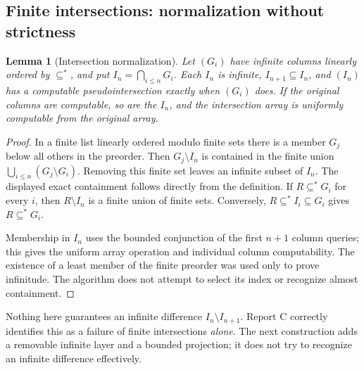 \documentclass[11pt,a4paper]{article}
\newcommand{\substar}{\subseteq^{*}}\newcommand{\lestar}{\leq^{*}}
\newtheorem{lemma}[theorem]{Lemma}
\theoremstyle{definition}\newtheorem{definition}[theorem]{Definition}
\theoremstyle{remark}\newtheorem{remark}[theorem]{Remark}
\begin{document}
\subsection{Finite intersections: normalization without strictness}
\begin{lemma}[Intersection normalization]\label{lem:intersection}\label{prop:intersection}
Let $(G_i)$ have infinite columns linearly ordered by $\substar$, and put $I_n=\bigcap_{i\leq n}G_i$. Each $I_n$ is infinite, $I_{n+1}\subseteq I_n$, and $(I_n)$ has a computable pseudointersection exactly when $(G_i)$ does. If the original columns are computable, so are the $I_n$, and the intersection array is uniformly computable from the original array.
\end{lemma}
\begin{proof}
In a finite list linearly ordered modulo finite sets there is a member $G_j$ below all others in the preorder. Then $G_j\setminus I_n$ is contained in the finite union $\bigcup_{i\leq n}(G_j\setminus G_i)$. Removing this finite set leaves an infinite subset of $I_n$. The displayed exact containment follows directly from the definition. If $R\substar G_i$ for every $i$, then $R\setminus I_n$ is a finite union of finite sets. Conversely, $R\substar I_i\subseteq G_i$ gives $R\substar G_i$.

Membership in $I_n$ uses the bounded conjunction of the first $n+1$ column queries; this gives the uniform array operation and individual column computability. The existence of a least member of the finite preorder was used only to prove infinitude. The algorithm does not attempt to select its index or recognize almost containment.
\end{proof}
Nothing here guarantees an infinite difference $I_n\setminus I_{n+1}$. Report C correctly identifies this as a failure of finite intersections \emph{alone}. The next construction adds a removable infinite layer and a bounded projection; it does not try to recognize an infinite difference effectively.
\end{document}
